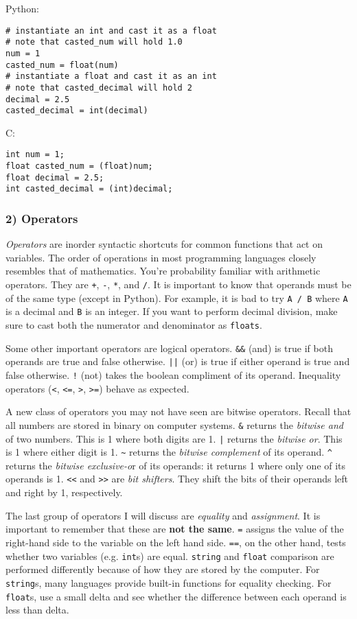 \documentclass[a4paper]{article}
\begin{document}
Python:
\begin{verbatim}
# instantiate an int and cast it as a float
# note that casted_num will hold 1.0
num = 1
casted_num = float(num)
# instantiate a float and cast it as an int
# note that casted_decimal will hold 2
decimal = 2.5
casted_decimal = int(decimal)
\end{verbatim}

C:
\begin{verbatim}
int num = 1;
float casted_num = (float)num;
float decimal = 2.5;
int casted_decimal = (int)decimal;
\end{verbatim}


\subsubsection{2) Operators}

{\it Operators} are inorder syntactic shortcuts for common functions that act on variables. The order of operations in most programming languages closely resembles that of mathematics. You’re probability familiar with arithmetic operators. They are \texttt{+}, \texttt{-}, \texttt{*}, and \texttt{/}. It is important to know that operands must be of the same type (except in Python). For example, it is bad to try \texttt{A / B} where \texttt{A} is a decimal and \texttt{B} is an integer. If you want to perform decimal division, make sure to cast both the numerator and denominator as \texttt{floats}.

Some other important operators are logical operators. \texttt{\&\&} (and) is true if both operands are true and false otherwise. \texttt{||} (or) is true if either operand is true and false otherwise. \texttt{!} (not) takes the boolean compliment of its operand. Inequality operators (\texttt{<}, \texttt{<=}, \texttt{>}, \texttt{>=}) behave as expected.

A \info new class of operators you may not have seen are bitwise operators. Recall that all numbers are stored in binary on computer systems. \texttt{\&} returns the {\it bitwise and} of two numbers. This is 1 where both digits are 1. \texttt{|} returns the {\it bitwise or}. This is 1 where either digit is 1. \texttt{\~} returns the {\it bitwise complement} of its operand. \texttt{\^} returns the {\it bitwise exclusive-o}r of its operands: it returns 1 where only one of its operands is 1. \texttt{<<} and \texttt{>>} are {\it bit shifters}. They shift the bits of their operands left and right by 1, respectively.

The last group of operators I will discuss are {\it equality} and {\it assignment}. It is important to remember that these are {\bf not the same}. \texttt{=} assigns the value of the right-hand side to the variable on the left hand side. \texttt{==}, on the other hand, tests whether two variables (e.g. \texttt{int}s) are equal. \texttt{string} and \texttt{float} comparison are performed differently because of how they are stored by the computer. For \texttt{string}s, many languages provide built-in functions for equality checking. For \texttt{float}s, use a small delta and see whether the difference between each operand is less than delta.
\end{document}
